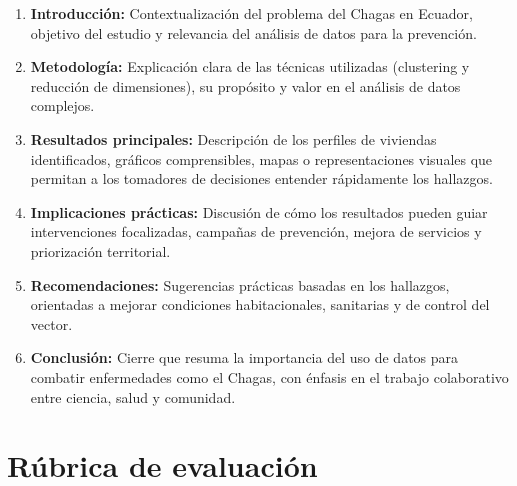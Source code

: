 \documentclass[a4,11pt]{aleph-notas}
\begin{document}
\begin{enumerate}[leftmargin=*, label={\textbf{\arabic*.}}]

\item \textbf{Introducción:} Contextualización del problema del Chagas en Ecuador, objetivo del estudio y relevancia del análisis de datos para la prevención.

\item \textbf{Metodología:} Explicación clara de las técnicas utilizadas (clustering y reducción de dimensiones), su propósito y valor en el análisis de datos complejos.

\item \textbf{Resultados principales:} Descripción de los perfiles de viviendas identificados, gráficos comprensibles, mapas o representaciones visuales que permitan a los tomadores de decisiones entender rápidamente los hallazgos.

\item \textbf{Implicaciones prácticas:} Discusión de cómo los resultados pueden guiar intervenciones focalizadas, campañas de prevención, mejora de servicios y priorización territorial.

\item \textbf{Recomendaciones:} Sugerencias prácticas basadas en los hallazgos, orientadas a mejorar condiciones habitacionales, sanitarias y de control del vector.

\item \textbf{Conclusión:} Cierre que resuma la importancia del uso de datos para combatir enfermedades como el Chagas, con énfasis en el trabajo colaborativo entre ciencia, salud y comunidad.
\end{enumerate}

\section{Rúbrica de evaluación}
\end{document}
